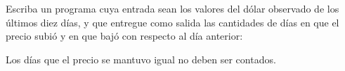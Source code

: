 \documentclass[11pt,spanish,a5paper,landscape]{article}
\begin{document}
  \thispagestyle{empty}

  Escriba un programa cuya entrada sean
  los valores del dólar observado de los últimos diez días,
  y que entregue como salida
  las cantidades de días en que el precio subió y en que bajó
  con respecto al día anterior:

  

  Los días que el precio se mantuvo igual no deben ser contados.
\end{document}
